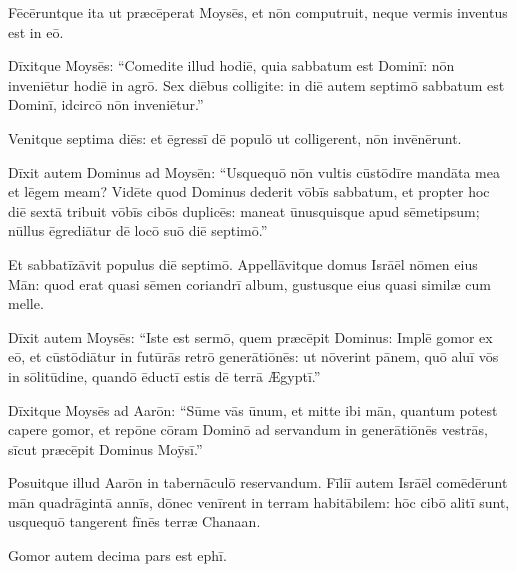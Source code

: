 Fēcēruntque ita ut præcēperat Moysēs, et nōn computruit, neque
vermis inventus est in eō.

Dīxitque Moysēs: ``Comedite
illud hodiē, quia sabbatum est Dominī: nōn inveniētur
hodiē in agrō. Sex diēbus colligite: in diē autem
septimō sabbatum est Dominī, idcircō nōn
inveniētur.''

Venitque septima diēs: et ēgressī dē populō ut
colligerent, nōn invēnērunt.

Dīxit autem Dominus ad
Moysēn: ``Us\-quequō nōn vultis
cūstōdīre mandāta mea et lēgem meam? Vidēte quod Dominus dederit vōbīs
sabbatum, et propter hoc diē sextā tribuit vōbīs cibōs
duplicēs: maneat ūnusquisque apud sēmetipsum; nūllus
ēgrediātur dē locō suō diē septimō.''

Et sabbatīzāvit
populus diē septimō. \linebreak{}Appellāvitque domus Isrāēl nōmen eius Mān: quod erat quasi sēmen
coriandrī album, gustusque eius quasi
similæ cum melle.

Dīxit autem Moysēs: ``Iste est sermō, quem præcēpit
Dominus: Implē gomor ex eō, et cūstōdiātur in futūrās
retrō generātiōnēs: ut nōverint pānem, quō aluī vōs in sōlitūdine, quandō
ēductī estis dē terrā Ægyptī.''

Dīxitque Moysēs ad Aarōn: ``Sūme vās ūnum,
et mitte ibi mān, quantum potest capere gomor, et repōne cōram Dominō ad
servandum in generātiōnēs vestrās, sīcut præcēpit Dominus Moȳsī.''

Posuitque illud Aarōn in tabernāculō reservandum. Fīliī autem Isrāēl
comēdērunt mān quadrāgintā annīs, dōnec venīrent in terram habitābilem: hōc cibō alitī sunt, usquequō
tangerent fīnēs terræ Chanaan.

Gomor autem decima pars
est ephī.

